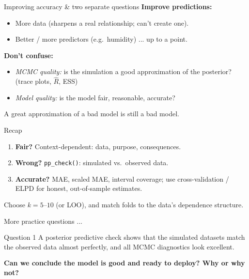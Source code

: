 \documentclass[aspectratio=43,11pt]{beamer}
\begin{document}
\begin{frame}{Improving accuracy \& two separate questions}
  \textbf{Improve predictions:}
  \begin{itemize}
    \item More data (sharpens a real relationship; can't create one).
    \item Better / more predictors (e.g.\ humidity) ... up to a point.
  \end{itemize}
  \vspace{0.6em}
  \textbf{Don't confuse:}
  \begin{itemize}
    \item \emph{MCMC quality:} is the simulation a good approximation of
      the posterior? (trace plots, $\hat R$, ESS)
    \item \emph{Model quality:} is the model fair, reasonable, accurate?
  \end{itemize}
  A great approximation of a bad model is still a bad model.
\end{frame}

\begin{frame}{Recap}
  \begin{enumerate}
    \item \textbf{Fair?} Context-dependent: data, purpose, consequences.
    \item \textbf{Wrong?} \texttt{pp\_check()}: simulated vs.\ observed data.
    \item \textbf{Accurate?} MAE, scaled MAE, interval coverage;
      use cross-validation / ELPD for honest, out-of-sample estimates.
  \end{enumerate}
  \vspace{0.5em}
  Choose $k = 5$--$10$ (or LOO), and match folds to the data's
  dependence structure.
\end{frame}

\begin{frame}
  \centering\Large More practice questions ...
\end{frame}

\begin{frame}{Question 1}
  A posterior predictive check shows that the simulated datasets match
  the observed data almost perfectly, and all MCMC diagnostics look excellent.
  \vspace{0.6em}

  \textbf{Can we conclude the model is good and ready to deploy?
  Why or why not?}
\end{frame}
\end{document}
